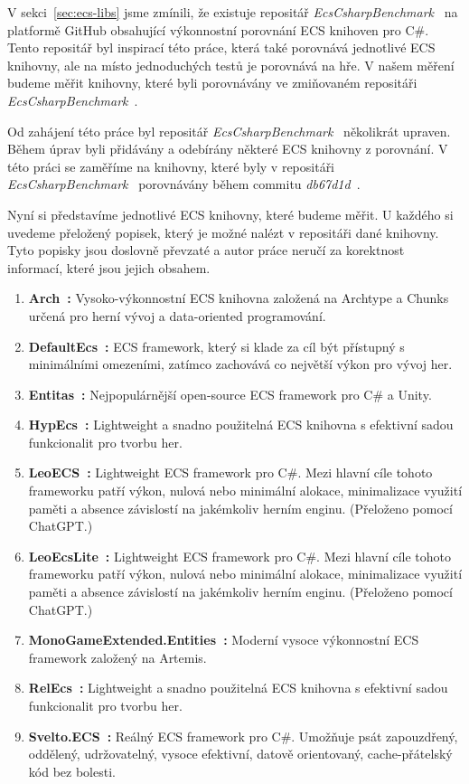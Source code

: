 V sekci~\ref{sec:ecs-libs} jsme zmínili, že existuje repositář \textit{EcsCsharpBenchmark}~\cite{EcsCsharpBenchmark} na platformě GitHub obsahující výkonnostní porovnání ECS knihoven pro C\#. Tento repositář byl inspirací této práce, která také porovnává jednotlivé ECS knihovny, ale na místo jednoduchých testů je porovnává na hře. V našem měření budeme měřit knihovny, které byli porovnávány ve zmiňovaném repositáři \textit{EcsCsharpBenchmark}~\cite{EcsCsharpBenchmark}.

Od zahájení této práce byl repositář \textit{EcsCsharpBenchmark}~\cite{EcsCsharpBenchmark} několikrát upraven. Během úprav byli přidávány a odebírány některé ECS knihovny z porovnání. V této práci se zaměříme na knihovny, které byly v repositáři \textit{EcsCsharpBenchmark}~\cite{EcsCsharpBenchmark} porovnávány během commitu \textit{db67d1d}~\cite{EcsCsharpBenchmarkCommit}.

Nyní si představíme jednotlivé ECS knihovny, které budeme měřit. U každého si uvedeme přeložený popisek, který je možné nalézt v repositáři dané knihovny. Tyto popisky jsou doslovně převzaté a autor práce neručí za korektnost informací, které jsou jejich obsahem.

\begin{enumerate}
    \item \textbf{Arch~\cite{Arch}:} Vysoko-výkonnostní ECS knihovna založená na Archtype a Chunks určená pro herní vývoj a data-oriented programování.
    \item \textbf{DefaultEcs~\cite{DefaultEcs}:} ECS framework, který si klade za cíl být přístupný s minimálními omezeními, zatímco zachovává co největší výkon pro vývoj her.
    \item \textbf{Entitas~\cite{Entitas}:} Nejpopulárnější open-source ECS framework pro C\# a Unity.
    \item \textbf{HypEcs~\cite{HypEcs}:} Lightweight a snadno použitelná ECS knihovna s efektivní sadou funkcionalit pro tvorbu her.
    \item \textbf{LeoECS~\cite{LeoECS}:} Lightweight ECS framework pro C\#. Mezi hlavní cíle tohoto frameworku patří výkon, nulová nebo minimální alokace, minimalizace využití paměti a absence závislostí na jakémkoliv herním enginu. (Přeloženo pomocí ChatGPT.)
    \item \textbf{LeoEcsLite~\cite{LeoEcsLite}:} Lightweight ECS framework pro C\#. Mezi hlavní cíle tohoto frameworku patří výkon, nulová nebo minimální alokace, minimalizace využití paměti a absence závislostí na jakémkoliv herním enginu. (Přeloženo pomocí ChatGPT.)
    \item \textbf{MonoGameExtended.Entities~\cite{MonoGameExtended}:} Moderní vysoce výkonnostní ECS framework založený na Artemis.
    \item \textbf{RelEcs~\cite{RelEcs}:} Lightweight a snadno použitelná ECS knihovna s efektivní sadou funkcionalit pro tvorbu her.
    \item \textbf{Svelto.ECS~\cite{SveltoECS}:} Reálný ECS framework pro C\#. Umožňuje psát zapouzdřený, oddělený, udržovatelný, vysoce efektivní, datově orientovaný, cache-přátelský kód bez bolesti.
\end{enumerate}

